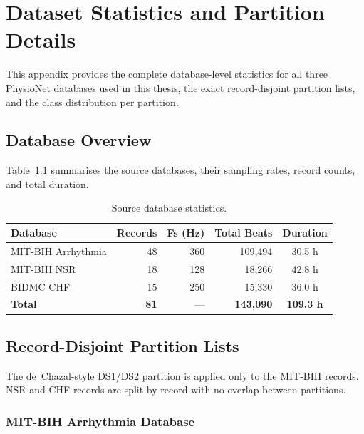 \chapter{Dataset Statistics and Partition Details}
\label{app:dataset}

This appendix provides the complete database-level statistics for all
three PhysioNet databases used in this thesis, the exact
record-disjoint partition lists, and the class distribution per
partition.


\section{Database Overview}
\label{app:db_overview}

Table~\ref{tab:db_stats} summarises the source databases, their
sampling rates, record counts, and total duration.

\begin{table}[!t]
\centering
\caption{Source database statistics.}
\label{tab:db_stats}
\begin{tabular}{@{}lrrrc@{}}
\toprule
\textbf{Database} & \textbf{Records} & \textbf{Fs (Hz)} & \textbf{Total Beats} & \textbf{Duration} \\
\midrule
MIT-BIH Arrhythmia   & 48  & 360 & 109,494 & 30.5 h \\
MIT-BIH NSR          & 18  & 128 &  18,266 & 42.8 h \\
BIDMC CHF            & 15  & 250 &  15,330 & 36.0 h \\
\midrule
\textbf{Total}       & \textbf{81} & --- & \textbf{143,090} & \textbf{109.3 h} \\
\bottomrule
\end{tabular}
\end{table}


\section{Record-Disjoint Partition Lists}
\label{app:partitions}

The de~Chazal-style DS1/DS2 partition is applied only to the MIT-BIH
records. NSR and CHF records are split by record with no overlap
between partitions.

\subsection{MIT-BIH Arrhythmia Database}

